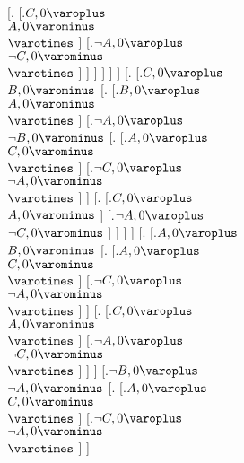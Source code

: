 [.{} [.{$C, 0\varoplus $ \\ $A, 0\varominus $ \\ $ \varotimes  $}  ] 
[.{$\neg A, 0\varoplus $ \\ $\neg C, 0\varominus $ \\ $ \varotimes  $}  ]  ]  ]  ]  ]  ] 
[.{} [.{$C, 0\varoplus $ \\ $B, 0\varominus $} [.{} [.{$B, 0\varoplus $ \\ $A, 0\varominus $ \\ $ \varotimes  $}  ] 
[.{$\neg A, 0\varoplus $ \\ $\neg B, 0\varominus $} [.{} [.{$A, 0\varoplus $ \\ $C, 0\varominus $ \\ $ \varotimes  $}  ] 
[.{$\neg C, 0\varoplus $ \\ $\neg A, 0\varominus $ \\ $ \varotimes  $}  ]  ] 
[.{} [.{$C, 0\varoplus $ \\ $A, 0\varominus $}  ] 
[.{$\neg A, 0\varoplus $ \\ $\neg C, 0\varominus $}  ]  ]  ]  ] 
[.{} [.{$A, 0\varoplus $ \\ $B, 0\varominus $} [.{} [.{$A, 0\varoplus $ \\ $C, 0\varominus $ \\ $ \varotimes  $}  ] 
[.{$\neg C, 0\varoplus $ \\ $\neg A, 0\varominus $ \\ $ \varotimes  $}  ]  ] 
[.{} [.{$C, 0\varoplus $ \\ $A, 0\varominus $ \\ $ \varotimes  $}  ] 
[.{$\neg A, 0\varoplus $ \\ $\neg C, 0\varominus $ \\ $ \varotimes  $}  ]  ]  ] 
[.{$\neg B, 0\varoplus $ \\ $\neg A, 0\varominus $} [.{} [.{$A, 0\varoplus $ \\ $C, 0\varominus $ \\ $ \varotimes  $}  ] 
[.{$\neg C, 0\varoplus $ \\ $\neg A, 0\varominus $ \\ $ \varotimes  $}  ]  ] 
